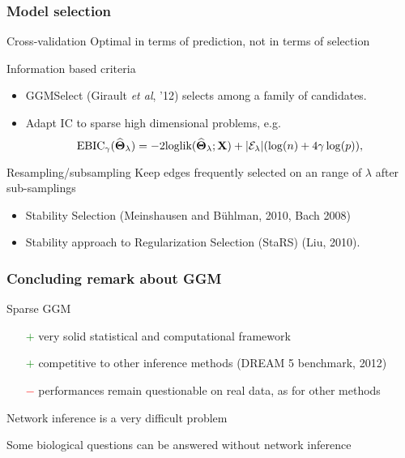 \begin{frame}
  \frametitle{Model selection}
  
  \begin{block}{Cross-validation}
    Optimal in terms of \alert{prediction}, not in terms of selection
  \end{block}

  \begin{block}{Information based criteria}
    \begin{itemize}
    \item GGMSelect (Girault \textit{et al}, '12) selects among a family of candidates.
    \item Adapt IC to sparse high dimensional problems, e.g.
    \begin{equation*}
      \text{EBIC}_\gamma(\widehat{{\boldsymbol\Theta}}_\lambda)  =   -2 \textrm{loglik}
      (\widehat{{\boldsymbol\Theta}}_\lambda;\mathbf{X}) + |\mathcal{E}_\lambda| (\log(n) + 4 \gamma \log(p) ),
    \end{equation*}
    \end{itemize}
  \end{block}

  \begin{block}{Resampling/subsampling}
    \alert{Keep edges frequently selected} on an range of $\lambda$ after sub-samplings
    \begin{itemize}
    \item Stability Selection (Meinshausen and B\"uhlman, 2010, Bach 2008)
    \item Stability approach to Regularization Selection (StaRS) (Liu, 2010).
    \end{itemize}
  \end{block}
\end{frame}

\begin{frame}
  \frametitle{Concluding remark about GGM}

    \begin{block}{Sparse GGM}
    \begin{itemize}
      \item[\textcolor{green}{$+$}]     very     solid
      \alert{statistical} and \alert{computational} framework
      \item[\textcolor{green}{$+$}] \alert{competitive}  to other inference
        methods (DREAM 5 benchmark, 2012)
      \item[\textcolor{red}{$-$}]        performances        remain
        \alert{questionable on real data}, as for other methods
      \end{itemize}
    \end{block}

    \rsa Network inference is a very difficult problem

    \rsa Some biological questions can be answered without network inference

\end{frame}
